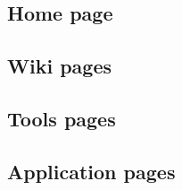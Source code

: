 \subsection{Home page}


\subsection{Wiki pages}


\subsection{Tools pages}


\subsection{Application pages}


